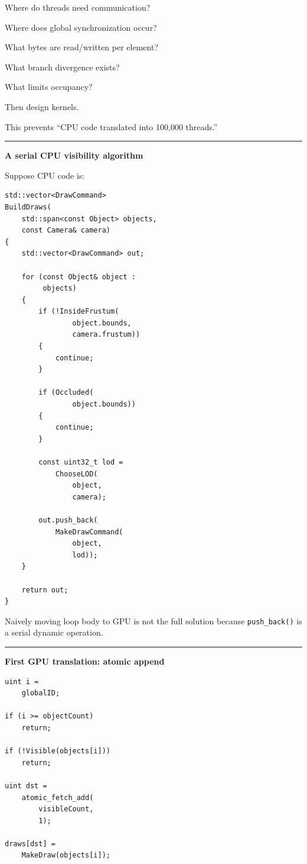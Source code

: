Where do threads need communication?

Where does global synchronization occur?

What bytes are read/written per element?

What branch divergence exists?

What limits occupancy?

Then design kernels.

This prevents ``CPU code translated into 100,000 threads.''

\begin{center}\rule{0.5\linewidth}{0.5pt}\end{center}

\textbf{A serial CPU visibility algorithm}

Suppose CPU code is:

\protect{}\label{p10-serial-cull}%
\begin{verbatim}
std::vector<DrawCommand>
BuildDraws(
    std::span<const Object> objects,
    const Camera& camera)
{
    std::vector<DrawCommand> out;

    for (const Object& object :
         objects)
    {
        if (!InsideFrustum(
                object.bounds,
                camera.frustum))
        {
            continue;
        }

        if (Occluded(
                object.bounds))
        {
            continue;
        }

        const uint32_t lod =
            ChooseLOD(
                object,
                camera);

        out.push_back(
            MakeDrawCommand(
                object,
                lod));
    }

    return out;
}
\end{verbatim}

Naively moving loop body to GPU is not the full solution because \texttt{push\_back()} is a serial dynamic operation.

\begin{center}\rule{0.5\linewidth}{0.5pt}\end{center}

\textbf{First GPU translation: atomic append}

\protect{}\label{p10-atomic-cull}%
\begin{verbatim}
uint i =
    globalID;

if (i >= objectCount)
    return;

if (!Visible(objects[i]))
    return;

uint dst =
    atomic_fetch_add(
        visibleCount,
        1);

draws[dst] =
    MakeDraw(objects[i]);
\end{verbatim}


